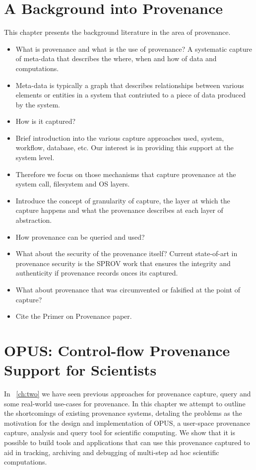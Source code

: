 \documentclass[withindex,glossary]{cam-thesis}
\begin{document}
\chapter{A Background into Provenance}
This chapter presents the background literature in the area of provenance.
\begin{itemize}
\item What is provenance and what is the use of provenance? A systematic capture of meta-data that describes the where, when and how of data and computations.
\item Meta-data is typically a graph that describes relationships between various elements or entities in a system that contriuted to a piece of data produced by the system.
\item How is it captured?
\item Brief introduction into the various capture approaches used, system, workflow, database, etc. Our interest is in providing this support at the system level.
\item Therefore we focus on those mechanisms that capture provenance at the system call, filesystem and OS layers.
\item Introduce the concept of granularity of capture, the layer at which the capture happens and what the provenance describes at each layer of abstraction.
\item How provenance can be queried and used?
\item What about the security of the provenance itself? Current state-of-art in provenance security is the SPROV work that ensures the integrity and authenticity if provenance records onces its captured.
\item What about provenance that was circumvented or falsified at the point of capture?
\item Cite the Primer on Provenance paper.
\end{itemize}

\chapter{OPUS: Control-flow Provenance Support for Scientists}
In ~\ref{ch:two} we have seen previous approaches for provenance capture, query and some real-world use-cases for provenance. In this chapter we attempt to outline the shortcomings of existing provenance systems, detaling the problems as the motivation for the design and implementation of OPUS, a user-space provenance capture, analysis and query tool for scientific computing. We show that it is possible to build tools and applications that can use this provenance captured to aid in tracking, archiving and debugging of multi-step ad hoc scientific computations.
\end{document}
